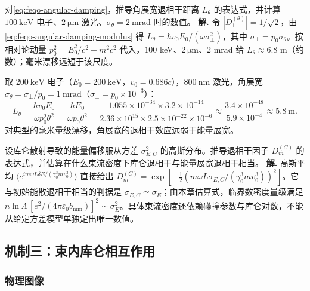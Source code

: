 \par
\begin{workedexample}
对\cref{eq:feqo-angular-damping}，推导角展宽退相干距离 $L_\theta$ 的表达式，并计算 $100\ \si{\kilo\electronvolt}$ 电子、$2\ \si{\micro\metre}$ 激光、$\sigma_\theta=2\ \si{\milli\radian}$ 时的数值。
\textbf{解.} 令 $|D_1^{(\theta)}|=1/\sqrt2$，由\cref{eq:feqo-angular-damping-modulus} 得 $L_\theta=\hbar v_0E_0/(\omega\sigma_\perp^2)$，其中 $\sigma_\perp=p_0\sigma_\theta$。按相对论动量 $p_0^2=E_0^2/c^2-m^2c^2$ 代入，$100$ keV、$2\,\si{\micro\metre}$、$2$ mrad 给 $L_\theta\approx6.8$ m（约数）；毫米漂移远短于该尺度。
\end{workedexample}
\par
\begin{exbox}[数值估计]
取 $200\ \si{\kilo\electronvolt}$ 电子（$E_0=200\ \si{\kilo\electronvolt}$，$v_0=0.686c$），$800\ \si{\nano\metre}$ 激光，角展宽 $\sigma_\theta=\sigma_\perp/p_0=1\ \si{\milli\radian}$（$\sigma_\perp=p_0\times10^{-3}$）：
\begin{equation}
L_\theta=\frac{\hbar v_0 E_0}{\omega p_0^2\theta^2}
=\frac{\hbar E_0}{\omega p_0\theta^2}
=\frac{1.055\times10^{-34}\times3.2\times10^{-14}}{2.36\times10^{15}\times2.5\times10^{-22}\times10^{-6}}
\approx\frac{3.4\times10^{-48}}{5.9\times10^{-4}}\approx 5.8\ \si{\metre}.
\end{equation}
对典型的毫米量级漂移，角展宽的退相干效应远弱于能量展宽。

\end{exbox}


\par
\begin{workedexample}
设库仑散射导致的能量偏移服从方差 $\sigma_{E,C}^2$ 的高斯分布。推导退相干因子 $D_m^{(C)}$ 的表达式，并估算在什么束流密度下库仑退相干与能量展宽退相干相当。
\textbf{解.} 高斯平均 $\langle e^{i m\omega L\delta E/(\gamma_0^3mv_0^3)}\rangle$ 直接给出 $D_m^{(C)}=\exp[-\tfrac12(m\omega L\sigma_{E,C}/(\gamma_0^3mv_0^3))^2]$。它与初始能散退相干相当的判据是 $\sigma_{E,C}\simeq\sigma_E$；由本章估算式，临界数密度量级满足 $n\ln\Lambda\,[e^2/(4\pi\varepsilon_0b_{\min})]^2\sim\sigma_E^2$。具体束流密度还依赖碰撞参数与库仑对数，不能从给定方差模型单独定出唯一数值。
\end{workedexample}
\par
\subsection{机制三：束内库仑相互作用}

\subsubsection{物理图像}

